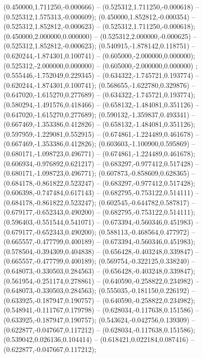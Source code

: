  (0.450000,1.711250,-0.000666) -- (0.525312,1.711250,-0.000618) -- (0.525312,1.575313,-0.000609);
 (0.450000,1.852812,-0.000354) -- (0.525312,1.852812,-0.000623) -- (0.525312,1.711250,-0.000618);
 (0.450000,2.000000,0.000000) -- (0.525312,2.000000,-0.000625) -- (0.525312,1.852812,-0.000623);
 (0.540915,-1.878142,0.118751) -- (0.620244,-1.874301,0.100741) -- (0.605000,-2.000000,0.000000);
 (0.525312,-2.000000,0.000000) -- (0.605000,-2.000000,0.000000) ;
 (0.555446,-1.752049,0.229345) -- (0.634322,-1.745721,0.193774) -- (0.620244,-1.874301,0.100741);
 (0.568655,-1.622780,0.329876) -- (0.647020,-1.615270,0.277689) -- (0.634322,-1.745721,0.193774);
 (0.580294,-1.491576,0.418466) -- (0.658132,-1.484081,0.351126) -- (0.647020,-1.615270,0.277689);
 (0.590132,-1.359837,0.493341) -- (0.667469,-1.353386,0.412826) -- (0.658132,-1.484081,0.351126);
 (0.597959,-1.229081,0.552915) -- (0.674861,-1.224489,0.461678) -- (0.667469,-1.353386,0.412826);
 (0.603603,-1.100900,0.595869) -- (0.680171,-1.098723,0.496771) -- (0.674861,-1.224489,0.461678);
 (0.606934,-0.976892,0.621217) -- (0.683297,-0.977412,0.517428) -- (0.680171,-1.098723,0.496771);
 (0.607873,-0.858609,0.628365) -- (0.684178,-0.861822,0.523247) -- (0.683297,-0.977412,0.517428);
 (0.606398,-0.747484,0.617143) -- (0.682795,-0.753122,0.514111) -- (0.684178,-0.861822,0.523247);
 (0.602545,-0.644782,0.587817) -- (0.679177,-0.652343,0.490200) -- (0.682795,-0.753122,0.514111);
 (0.596403,-0.551544,0.541071) -- (0.673394,-0.560346,0.451983) -- (0.679177,-0.652343,0.490200);
 (0.588113,-0.468564,0.477972) -- (0.665557,-0.477799,0.400189) -- (0.673394,-0.560346,0.451983);
 (0.578504,-0.394309,0.404838) -- (0.656428,-0.403248,0.339847) -- (0.665557,-0.477799,0.400189);
 (0.569754,-0.322125,0.338240) -- (0.648073,-0.330503,0.284563) -- (0.656428,-0.403248,0.339847);
 (0.561954,-0.251174,0.278861) -- (0.640590,-0.258822,0.234982) -- (0.648073,-0.330503,0.284563);
 (0.555035,-0.181150,0.226192) -- (0.633925,-0.187947,0.190757) -- (0.640590,-0.258822,0.234982);
 (0.548941,-0.111767,0.179798) -- (0.628034,-0.117638,0.151586) -- (0.633925,-0.187947,0.190757);
 (0.543624,-0.042756,0.139309) -- (0.622877,-0.047667,0.117212) -- (0.628034,-0.117638,0.151586);
 (0.539042,0.026136,0.104414) -- (0.618421,0.022184,0.087416) -- (0.622877,-0.047667,0.117212);
